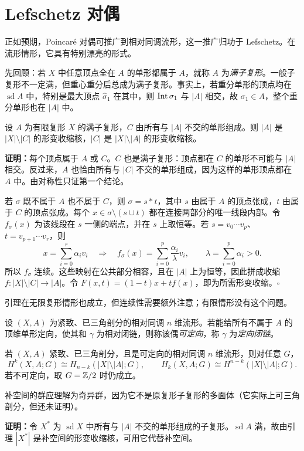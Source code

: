 \section{Lefschetz 对偶}
正如预期，Poincaré 对偶可推广到相对同调流形，这一推广归功于 Lefschetz。在流形情形，它具有特别漂亮的形式。

先回顾：若 $X$ 中任意顶点全在 $A$ 的单形都属于 $A$，就称 $A$ 为\emph{满子复形}。一般子复形不一定满，但重心重分后总成为满子复形。事实上，若重分单形的顶点均在 $\operatorname{sd}A$ 中，特别是最大顶点 $\widehat\sigma_1$ 在其中，则 $\operatorname{Int}\sigma_1$ 与 $|A|$ 相交，故 $\sigma_1\in A$，整个重分单形也在 $|A|$ 中。

设 $A$ 为有限复形 $X$ 的满子复形，$C$ 由所有与 $|A|$ 不交的单形组成。则 $|A|$ 是 $|X|\setminus|C|$ 的形变收缩核，$|C|$ 是 $|X|\setminus|A|$ 的形变收缩核。

\textbf{证明：}每个顶点属于 $A$ 或 $C$。$C$ 也是满子复形：顶点都在 $C$ 的单形不可能与 $|A|$ 相交。反过来，$A$ 也恰由所有与 $|C|$ 不交的单形组成，因为这样的单形顶点都在 $A$ 中。由对称性只证第一个结论。

若 $\sigma$ 既不属于 $A$ 也不属于 $C$，则 $\sigma=s*t$，其中 $s$ 由属于 $A$ 的顶点张成，$t$ 由属于 $C$ 的顶点张成。每个 $x\in\sigma\setminus(s\cup t)$ 都在连接两部分的唯一线段内部。令 $f_\sigma(x)$ 为该线段在 $s$ 一侧的端点，并在 $s$ 上取恒等。若 $s=v_0\cdots v_p$、$t=v_{p+1}\cdots v_r$，则
\[x=\sum_{i=0}^r\alpha_iv_i\quad\Longrightarrow\quad
f_\sigma(x)=\sum_{i=0}^p\frac{\alpha_i}{\lambda}v_i,\qquad\lambda=\sum_{i=0}^p\alpha_i>0.\]
所以 $f_\sigma$ 连续。这些映射在公共部分相容，且在 $|A|$ 上为恒等，因此拼成收缩 $f:|X|\setminus|C|\to|A|$。令 $F(x,t)=(1-t)x+tf(x)$，即为所需形变收缩。\hfill$\square$

引理在无限复形情形也成立，但连续性需要额外注意；有限情形没有这个问题。

设 $(X,A)$ 为紧致、已三角剖分的相对同调 $n$ 维流形。若能给所有不属于 $A$ 的顶维单形定向，使其和 $\gamma$ 为相对闭链，则称该偶\emph{可定向}，称 $\gamma$ 为\emph{定向闭链}。

若 $(X,A)$ 紧致、已三角剖分，且是可定向的相对同调 $n$ 维流形，则对任意 $G$，
\[H^k(X,A;G)\cong H_{n-k}(|X|\setminus|A|;G),\qquad
H_k(X,A;G)\cong H^{n-k}(|X|\setminus|A|;G).\]
若不可定向，取 $G=\mathbb{Z}/2$ 时仍成立。

补空间的群应理解为奇异群，因为它不是原复形子复形的多面体（它实际上可三角剖分，但还未证明）。

\textbf{证明：}令 $X^*$ 为 $\operatorname{sd}X$ 中所有与 $|A|$ 不交的单形组成的子复形。$\operatorname{sd}A$ 满，故由引理 $|X^*|$ 是补空间的形变收缩核，可用它代替补空间。

